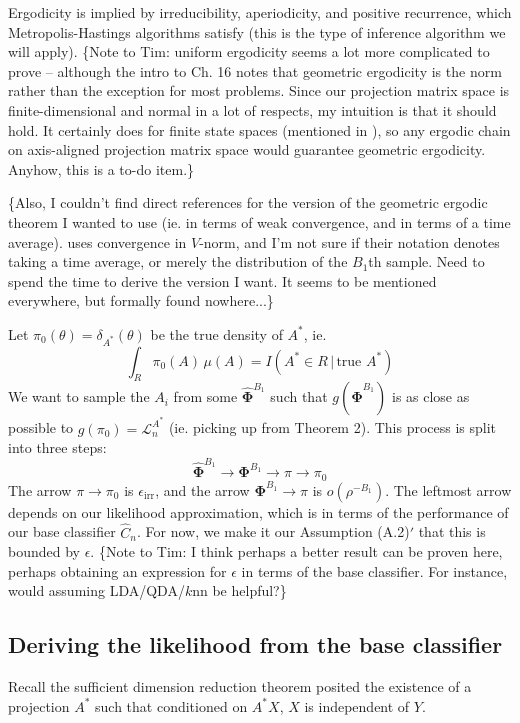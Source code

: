 \documentclass[ejs,preprint]{imsart}
\newcommand\risk{\mathcal{L}}
\begin{document}
Ergodicity is implied by irreducibility, aperiodicity, and positive recurrence, which Metropolis-Hastings algorithms satisfy (this is the type of inference algorithm we will apply). \{Note to Tim: uniform ergodicity seems a lot more complicated to prove -- although the intro to \cite{MT93} Ch. 16 notes that geometric ergodicity is the norm rather than the exception for most problems. Since our projection matrix space is finite-dimensional and normal in a lot of respects, my intuition is that it should hold. It certainly does for finite state spaces (mentioned in \cite{Sarig08}), so any ergodic chain on axis-aligned projection matrix space would guarantee geometric ergodicity. Anyhow, this is a to-do item.\}

\{Also, I couldn't find direct references for the version of the geometric ergodic theorem I wanted to use (ie. in terms of weak convergence, and in terms of a time average). \cite{MT93} uses convergence in $V$-norm, and I'm not sure if their notation denotes taking a time average, or merely the distribution of the $B_1$th sample. Need to spend the time to derive the version I want. It seems to be mentioned everywhere, but formally found nowhere...\}

Let $\pi_0(\theta)=\delta_{A^*}(\theta)$ be the true density of $A^*$, ie.
\[
\int_R\!\pi_0(A)\,\mu(A)=I(A^*\in R\,|\,\text{true }A^*)
\]
We want to sample the $A_i$ from some $\hat{\bm{\Phi}}^{B_1}$ such that $g(\hat{\bm{\Phi}}^{B_1})$ is as close as possible to $g(\pi_0)=\risk_n^{A^*}$ (ie. picking up from Theorem 2). This process is split into three steps:
\[
\hat{\bm{\Phi}}^{B_1} \to \bm{\Phi}^{B_1} \to \pi \to \pi_0
\]
The arrow $\pi\to\pi_0$ is $\epsilon_\mathrm{irr}$, and the arrow $\bm{\Phi}^{B_1}\to\pi$ is $o(\rho^{-B_1})$. The leftmost arrow depends on our likelihood approximation, which is in terms of the performance of our base classifier $\hat C_n$. For now, we make it our Assumption (A.2)$'$ that this is bounded by $\epsilon$. \{Note to Tim: I think perhaps a better result can be proven here, perhaps obtaining an expression for $\epsilon$ in terms of the base classifier. For instance, would assuming LDA/QDA/$k$nn be helpful?\}

\subsection{Deriving the likelihood from the base classifier}

Recall the sufficient dimension reduction theorem posited the existence of a projection $A^*$ such that conditioned on $A^*X$, $X$ is independent of $Y$.
\end{document}
